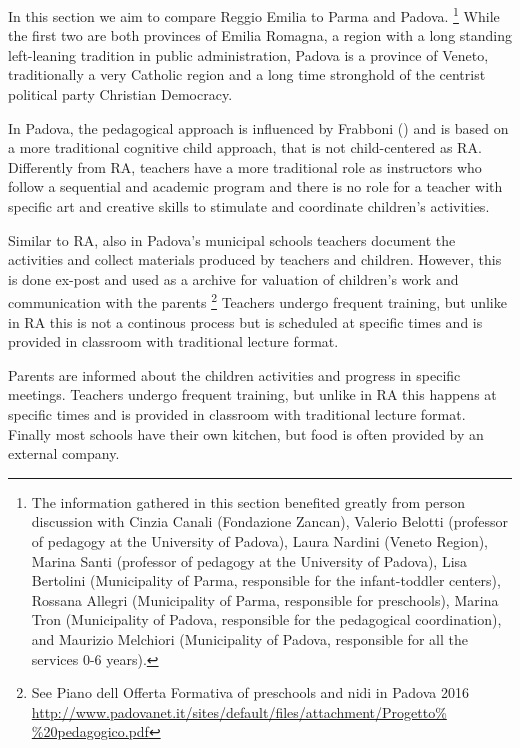 \documentclass[12pt]{article}
\begin{document}
In this section we aim to compare Reggio Emilia to Parma and Padova.%
\footnote{%
The information gathered in this section benefited greatly from person
discussion with Cinzia Canali (Fondazione Zancan), Valerio Belotti
(professor of pedagogy at the University of Padova), Laura Nardini (Veneto
Region), Marina Santi (professor of pedagogy at the University of Padova),
Lisa Bertolini (Municipality of Parma, responsible for the infant-toddler
centers), Rossana Allegri (Municipality of Parma, responsible for
preschools), Marina Tron (Municipality of Padova, responsible for the
pedagogical coordination), and Maurizio Melchiori (Municipality of Padova,
responsible for all the services 0-6 years).} While the first two are both
provinces of Emilia Romagna, a region with a long standing left-leaning
tradition in public administration, Padova is a province of Veneto,
traditionally a very Catholic region and a long time stronghold of the
centrist political party Christian Democracy.

In Padova, the pedagogical approach is influenced by Frabboni (\cite%
{Frabboni1999}) and is based on a more traditional cognitive child approach,
that is not child-centered as RA. Differently from RA, teachers have a more
traditional role as instructors who follow a sequential and academic program
and there is no role for a teacher with specific art and creative skills to
stimulate and coordinate children's activities.

Similar to RA, also in Padova's municipal schools teachers document the
activities and collect materials produced by teachers and children. However,
this is done ex-post and used as a archive for valuation of children's work
and communication with the parents \footnote{%
See Piano dell Offerta Formativa of preschools and nidi in Padova 2016 %
\url{http://www.padovanet.it/sites/default/files/attachment/Progetto%
\%20pedagogico.pdf}} Teachers undergo frequent training, but unlike in RA
this is not a continous process but is scheduled at specific times and is
provided in classroom with traditional lecture format.

Parents are informed about the children activities and progress in specific
meetings. Teachers undergo frequent training, but unlike in RA this happens
at specific times and is provided in classroom with traditional lecture
format. Finally most schools have their own kitchen, but food is often
provided by an external company.
\end{document}
